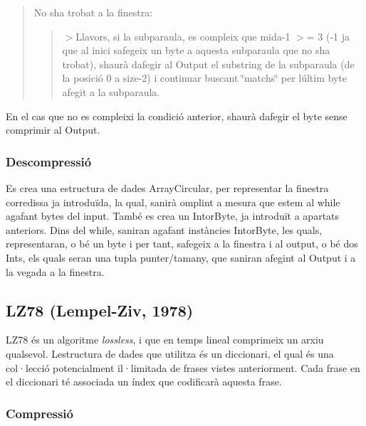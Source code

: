\begin{quote}
No s\textquotesingle{}ha trobat a la finestra\+: ~\newline
 \begin{quote}
$>$Llavors, si la subparaula, es compleix que mida-\/1 $>$= 3 (-\/1 ja que al inici s\textquotesingle{}afegeix un byte a aquesta subparaula que no s\textquotesingle{}ha trobat), s\textquotesingle{}haurà d\textquotesingle{}afegir al Output el substring de la subparaula (de la posició 0 a size-\/2) i continuar buscant \char`\"{}match\textquotesingle{}s\char`\"{} per l\textquotesingle{}últim byte afegit a la subparaula.~\newline
 \end{quote}
\end{quote}
En el cas que no es compleixi la condició anterior, s\textquotesingle{}haurà d\textquotesingle{}afegir el byte sense comprimir al Output.

\subsubsection*{Descompressió}

Es crea una estructura de dades Array\+Circular, per representar la finestra corredissa ja introduïda, la qual, s\textquotesingle{}anirà omplint a mesura que estem al while agafant byte\textquotesingle{}s del input. També es crea un Intor\+Byte, ja introduït a apartats anteriors. Dins del while, s\textquotesingle{}aniran agafant instàncies Intor\+Byte, les quals, representaran, o bé un byte i per tant, s\textquotesingle{}afegeix a la finestra i al output, o bé dos Int\textquotesingle{}s, els quals seran una tupla punter/tamany, que s\textquotesingle{}aniran afegint al Output i a la vegada a la finestra.

\subsection*{L\+Z78 (Lempel-\/\+Ziv, 1978)}

L\+Z78 és un algoritme {\itshape lossless}, i que en temps lineal comprimeix un arxiu qualsevol. L\textquotesingle{}estructura de dades que utilitza és un diccionari, el qual és una col·lecció potencialment il·limitada de frases vistes anteriorment. Cada frase en el diccionari té associada un índex que codificarà aquesta frase.

\subsubsection*{Compressió}

